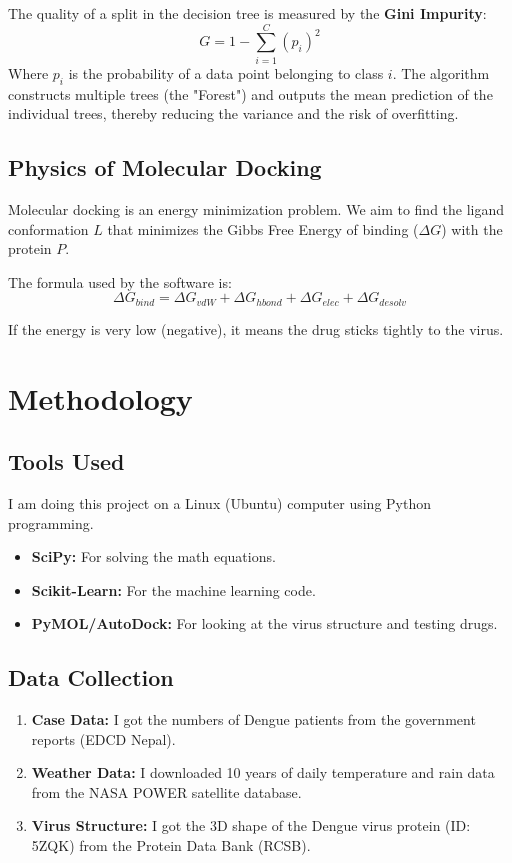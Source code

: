 \documentclass[12pt, a4paper]{article}
\begin{document}
The quality of a split in the decision tree is measured by the \textbf{Gini Impurity}:
\begin{equation}
    G = 1 - \sum_{i=1}^{C} (p_i)^2
\end{equation}
Where $p_i$ is the probability of a data point belonging to class $i$. The algorithm constructs multiple trees (the "Forest") and outputs the mean prediction of the individual trees, thereby reducing the variance and the risk of overfitting.

\subsection{Physics of Molecular Docking}
Molecular docking is an energy minimization problem. We aim to find the ligand conformation $L$ that minimizes the Gibbs Free Energy of binding ($\Delta G$) with the protein $P$.

The formula used by the software is:
\begin{equation}
    \Delta G_{bind} = \Delta G_{vdW} + \Delta G_{hbond} + \Delta G_{elec} + \Delta G_{desolv}
\end{equation}

If the energy is very low (negative), it means the drug sticks tightly to the virus.

\newpage

\section{Methodology}

\subsection{Tools Used}
I am doing this project on a Linux (Ubuntu) computer using Python programming.
\begin{itemize}
    \item \textbf{SciPy:} For solving the math equations.
    \item \textbf{Scikit-Learn:} For the machine learning code.
    \item \textbf{PyMOL/AutoDock:} For looking at the virus structure and testing drugs.
\end{itemize}

\subsection{Data Collection}
\begin{enumerate}
    \item \textbf{Case Data:} I got the numbers of Dengue patients from the government reports (EDCD Nepal).
    \item \textbf{Weather Data:} I downloaded 10 years of daily temperature and rain data from the NASA POWER satellite database.
    \item \textbf{Virus Structure:} I got the 3D shape of the Dengue virus protein (ID: 5ZQK) from the Protein Data Bank (RCSB).
\end{enumerate}
\end{document}
